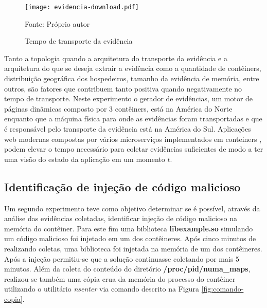 \begin{figure}[htb!]
\footnotesize
\caption{Tempo de transporte da evidência}
\texttt{[image: evidencia-download.pdf]}
\centering
\label{fig:evidencia_transporte}
\begin{center}
Fonte: Próprio autor 
\end{center}
\end{figure}


%
Tanto a topologia quando a arquitetura do transporte da evidência e a arquitetura do que se deseja extrair a evidência como a quantidade de contêiners, distribuição geográfica dos hospedeiros, tamanho da evidência de memória, entre outros, são fatores que contribuem tanto positiva quando negativamente no tempo de transporte.
%
Neste experimento o gerador de evidências, um motor de páginas dinâmicas composto por 3 contêiners, está na América do Norte enquanto que a máquina física para onde as evidências foram transportadas e que é responsável pelo transporte da evidência está na América do Sul.
%
Aplicações web modernas compostas por vários microserviços implementados em conteiners \cite{StubbsConteinersNumberMicroServices:2015}, podem elevar o tempo necessário para \fancyname coletar evidências suficientes de modo a ter uma visão do estado da aplicação em um momento $t$.

\subsection{Identificação de injeção de código malicioso}
\label{sec:proposta-exp-malware}

Um segundo experimento teve como objetivo determinar se é possível, através da análise das evidências coletadas, identificar injeção de código malicioso na memória do contêiner.
%
Para este fim uma biblioteca \textbf{libexample.so} simulando um código malicioso foi injetado em um dos contêineres.
%
Após cinco minutos de \fancyname realizando coletas, uma biblioteca foi injetada na memória de um dos contêineres. Após a injeção permitiu-se que a solução continuasse coletando por mais 5 minutos.
%
Além da coleta do conteúdo do diretório \textbf{/proc/pid/numa\_maps}, realizou-se também uma cópia crua da memória do processo do contêiner utilizando o utilitário \textit{nsenter} via comando descrito na Figura \ref{fig:comando-copia}.
%

%
%
%

